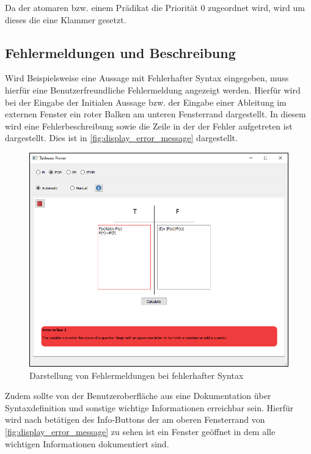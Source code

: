 Da der atomaren bzw. einem Prädikat die Priorität 0 zugeordnet wird, wird um dieses die eine Klammer gesetzt.

\subsection{Fehlermeldungen und Beschreibung}
Wird Beispielsweise eine Aussage mit Fehlerhafter Syntax eingegeben, muss hierfür eine Benutzerfreundliche Fehlermeldung angezeigt werden. Hierfür wird bei der Eingabe der Initialen Aussage bzw. der Eingabe einer Ableitung im externen Fenster ein roter Balken am unteren Fensterrand dargestellt. In diesem wird eine Fehlerbeschreibung sowie die Zeile in der der Fehler aufgetreten ist dargestellt. Dies ist in \autoref{fig:display_error_message} dargestellt.

\begin{figure}[h]
\begin{center}
\includegraphics[scale=0.8]{images/display_error_message.png}
\caption{Darstellung von Fehlermeldungen bei fehlerhafter Syntax}
\label{fig:display_error_message}
\end{center}
\end{figure}

Zudem sollte von der Benutzeroberfläche aus eine Dokumentation über Syntaxdefinition und sonstige wichtige Informationen erreichbar sein. Hierfür wird nach betätigen des Info-Buttons der am oberen Fensterrand von \autoref{fig:display_error_message} zu sehen ist ein Fenster geöffnet in dem alle wichtigen Informationen dokumentiert sind.